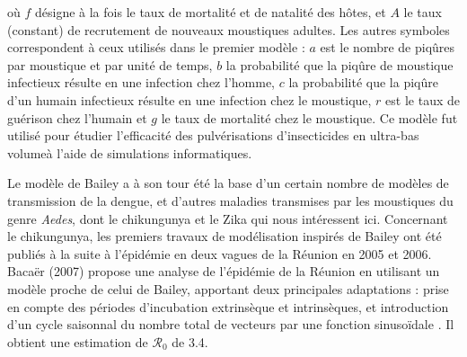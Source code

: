où $f$ désigne à la fois le taux de mortalité et de natalité des hôtes, et $A$ le taux (constant) de recrutement de nouveaux moustiques adultes.
Les autres symboles correspondent à ceux utilisés dans le premier modèle : $a$ est le nombre de piqûres par moustique et par unité de temps, $b$ la probabilité que la piqûre de moustique infectieux résulte en une infection chez l'homme, $c$  la probabilité que la piqûre d'un humain infectieux résulte en une infection chez le moustique, $r$ est le taux de guérison chez l'humain et $g$ le taux de mortalité chez le moustique.
Ce modèle fut utilisé pour étudier l'efficacité des pulvérisations d'insecticides en \guillemotleft ultra-bas volume\guillemotright à l'aide de simulations informatiques. 

Le modèle de Bailey a à son tour été la base d'un certain nombre de modèles de transmission de la dengue, et d'autres maladies transmises par les moustiques du genre {\em Aedes}, dont le chikungunya et le Zika qui nous intéressent ici.
Concernant le chikungunya, les premiers travaux de modélisation inspirés de Bailey ont été publiés à la suite à l'épidémie en deux vagues de la Réunion en 2005 et 2006.
Bacaër (2007) propose une analyse de l'épidémie de la Réunion en utilisant un modèle proche de celui de Bailey, apportant deux principales adaptations : prise en compte des périodes d'incubation extrinsèque et intrinsèques, et introduction d'un cycle saisonnal du nombre total de vecteurs par une fonction sinusoïdale \cite{bacaer2007approximation}. 
Il obtient une estimation de $\mathcal{R}_0$ de 3.4.
